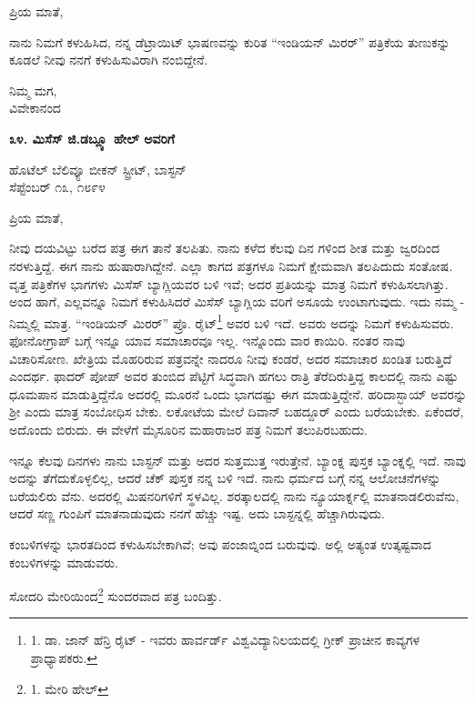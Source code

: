 ಪ್ರಿಯ ಮಾತೆ,

ನಾನು ನಿಮಗೆ ಕಳುಹಿಸಿದ, ನನ್ನ ಡೆಟ್ರಾಯಿಟ್ ಭಾಷಣವನ್ನು ಕುರಿತ “ಇಂಡಿಯನ್ ಮಿರರ್” ಪತ್ರಿಕೆಯ ತುಣುಕನ್ನು ಕೂಡಲೆ ನೀವು ನನಗೆ ಕಳುಹಿಸುವಿರಾಗಿ ನಂಬಿದ್ದೇನೆ.

\begin{flushright}
ನಿಮ್ಮ ಮಗ,\\ವಿವೇಕಾನಂದ
\end{flushright}

\begin{center}
\textbf{೩೪. ಮಿಸೆಸ್ ಜಿ.ಡಬ್ಲ್ಯೂ ಹೇಲ್ ಅವರಿಗೆ}
\end{center}

\begin{flushright}
ಹೊಟೆಲ್ ಬೆಲಿವ್ಯೂ ಬೀಕನ್ ಸ್ಟ್ರೀಟ್, ಬಾಸ್ಟನ್\\ಸೆಪ್ಟೆಂಬರ್ ೧೩, ೧೮೯೪
\end{flushright}

ಪ್ರಿಯ ಮಾತೆ,

ನೀವು ದಯವಿಟ್ಟು ಬರೆದ ಪತ್ರ ಈಗ ತಾನೆ ತಲಪಿತು. ನಾನು ಕಳೆದ ಕೆಲವು ದಿನ ಗಳಿಂದ ಶೀತ ಮತ್ತು ಜ್ವರದಿಂದ ನರಳುತ್ತಿದ್ದೆ. ಈಗ ನಾನು ಹುಷಾರಾಗಿದ್ದೇನೆ. ಎಲ್ಲಾ ಕಾಗದ ಪತ್ರಗಳೂ ನಿಮಗೆ ಕ್ಷೇಮವಾಗಿ ತಲಪಿದುದು ಸಂತೋಷ. ವೃತ್ತ ಪತ್ರಿಕೆಗಳ ಭಾಗಗಳು ಮಿಸೆಸ್ ಬ್ಯಾಗ್ಲಿಯವರ ಬಳಿ ಇವೆ; ಅದರ ಪ್ರತಿಯನ್ನು ಮಾತ್ರ ನಿಮಗೆ ಕಳುಹಿಸಲಾಗಿತ್ತು. ಅಂದ ಹಾಗೆ, ಎಲ್ಲವನ್ನೂ ನಿಮಗೆ ಕಳುಹಿಸಿದರೆ ಮಿಸೆಸ್ ಬ್ಯಾಗ್ಲಿಯ ವರಿಗೆ ಅಸೂಯೆ ಉಂಟಾಗುವುದು. ಇದು ನಮ್ಮ - ನಿಮ್ಮಲ್ಲಿ ಮಾತ್ರ. “ಇಂಡಿಯನ್ ಮಿರರ್” ಪ್ರೊ. ರೈಟ್\footnote{1. ಡಾ. ಜಾನ್ ಹೆನ್ರಿ ರೈಟ್ - ಇವರು ಹಾರ್ವರ್ಡ್ ವಿಶ್ವವಿದ್ಯಾನಿಲಯದಲ್ಲಿ ಗ್ರೀಕ್ ಪ್ರಾಚೀನ ಕಾವ್ಯಗಳ ಪ್ರಾಧ್ಯಾಪಕರು.} ಅವರ ಬಳಿ ಇದೆ. ಅವರು ಅದನ್ನು ನಿಮಗೆ ಕಳುಹಿಸುವರು. ಫೋನೋಗ್ರಾಪ್ ಬಗ್ಗೆ ಇನ್ನೂ ಯಾವ ಸಮಾಚಾರವೂ ಇಲ್ಲ. ಇನ್ನೊಂದು ವಾರ ಕಾಯಿರಿ. ನಂತರ ನಾವು ವಿಚಾರಿಸೋಣ. ಖೇತ್ರಿಯ ಮೊಹರಿರುವ ಪತ್ರವನ್ನೇ ನಾದರೂ ನೀವು ಕಂಡರೆ, ಅದರ ಸಮಾಚಾರ ಖಂಡಿತ ಬರುತ್ತಿದೆ ಎಂದರ್ಥ. ಫಾದರ್ ಪೋಪ್ ಅವರ ತುಂಬಿದ ಪೆಟ್ಟಿಗೆ ಸಿದ್ಧವಾಗಿ ಹಗಲು ರಾತ್ರಿ ತೆರೆದಿರುತ್ತಿದ್ದ ಕಾಲದಲ್ಲಿ ನಾನು ಎಷ್ಟು ಧೂಮಪಾನ ಮಾಡುತ್ತಿದ್ದೆನೊ ಅದರಲ್ಲಿ ಮೂರನೆ ಒಂದು ಭಾಗದಷ್ಟು ಈಗ ಮಾಡುತ್ತಿದ್ದೇನೆ. ಹರಿದಾಸ್ಭಾಯ್​ ಅವರನ್ನು ಶ‍್ರೀ ಎಂದು ಮಾತ್ರ ಸಂಬೋಧಿಸ ಬೇಕು. ಲಕೋಟೆಯ ಮೇಲೆ ದಿವಾನ್ ಬಹದ್ದೂರ್ ಎಂದು ಬರೆಯಬೇಕು. ಏಕೆಂದರೆ, ಅದೊಂದು ಬಿರುದು. ಈ ವೇಳೆಗೆ ಮೈಸೂರಿನ ಮಹಾರಾಜರ ಪತ್ರ ನಿಮಗೆ ತಲುಪಿರಬಹುದು.

ಇನ್ನೂ ಕೆಲವು ದಿನಗಳು ನಾನು ಬಾಸ್ಟನ್ ಮತ್ತು ಅದರ ಸುತ್ತಮುತ್ತ ಇರುತ್ತೇನೆ. ಬ್ಯಾಂಕ್ನ ಪುಸ್ತಕ ಬ್ಯಾಂಕ್ನಲ್ಲಿ ಇದೆ. ನಾವು ಅದನ್ನು ತೆಗೆದುಕೊಳ್ಳಲಿಲ್ಲ, ಆದರೆ ಚೆಕ್ ಪುಸ್ತಕ ನನ್ನ ಬಳಿ ಇದೆ. ನಾನು ಧರ್ಮದ ಬಗ್ಗೆ ನನ್ನ ಆಲೋಚನೆಗಳನ್ನು ಬರೆಯಲಿರು ವೆನು. ಅದರಲ್ಲಿ ಮಿಷನರಿಗಳಿಗೆ ಸ್ಥಳವಿಲ್ಲ. ಶರತ್ಕಾಲದಲ್ಲಿ ನಾನು ನ್ಯೂಯಾರ್ಕ್ನಲ್ಲಿ ಮಾತನಾಡಲಿರುವೆನು, ಆದರೆ ಸಣ್ಣ ಗುಂಪಿಗೆ ಮಾತನಾಡುವುದು ನನಗೆ ಹೆಚ್ಚು ಇಷ್ಟ. ಅದು ಬಾಸ್ಟನ್ನಲ್ಲಿ ಹೆಚ್ಚಾಗಿರುವುದು.

ಕಂಬಳಿಗಳನ್ನು ಭಾರತದಿಂದ ಕಳುಹಿಸಬೇಕಾಗಿವೆ; ಅವು ಪಂಜಾಬ್ನಿಂದ ಬರುವುವು. ಅಲ್ಲಿ ಅತ್ಯಂತ ಉತ್ಕಷ್ಟವಾದ ಕಂಬಳಿಗಳನ್ನು ಮಾಡುವರು.

ಸೋದರಿ ಮೇರಿಯಿಂದ\footnote{1. ಮೇರಿ ಹೇಲ್} ಸುಂದರವಾದ ಪತ್ರ ಬಂದಿತ್ತು.

